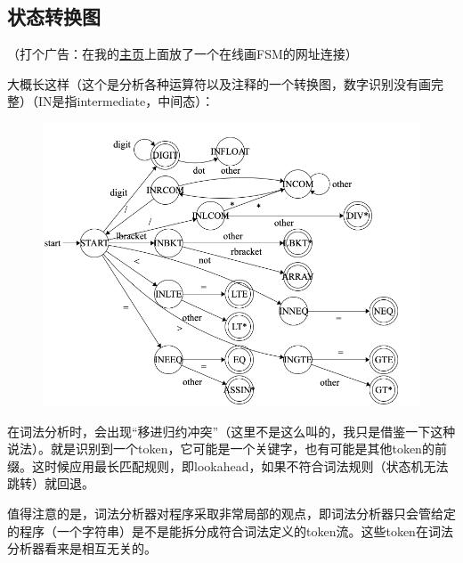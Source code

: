 \documentclass[]{report}
\begin{document}
		\subsection{状态转换图}
		（打个广告：在我的\href{http://home.ustc.edu.cn/~astark/}{主页}上面放了一个在线画FSM的网址连接）\par
		大概长这样（这个是分析各种运算符以及注释的一个转换图，数字识别没有画完整）（IN是指intermediate，中间态）：\par
		\begin{figure}[h!]
			\centering
			\begin{minipage}{40em}
				\centering
				\includegraphics[scale = 0.35]{images/FSM_Sample.png}
			\end{minipage}
		\end{figure}\par
		在词法分析时，会出现“移进归约冲突”（这里不是这么叫的，我只是借鉴一下这种说法）。就是识别到一个token，它可能是一个关键字，也有可能是其他token的前缀。这时候应用最长匹配规则，即lookahead，如果不符合词法规则（状态机无法跳转）就回退。\par
		值得注意的是，词法分析器对程序采取非常局部的观点，即词法分析器只会管给定的程序（一个字符串）是不是能拆分成符合词法定义的token流。这些token在词法分析器看来是相互无关的。
\end{document}
